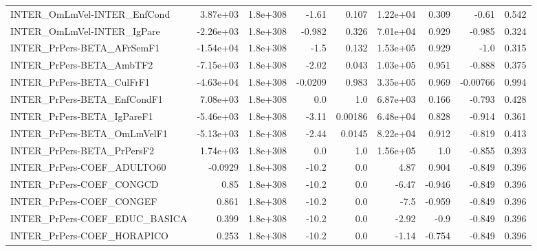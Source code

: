 \begin{tabular}{lrrrrrrrr}
INTER\_OmLmVel-INTER\_EnfCond           &    3.87e+03 &     1.8e+308 &   -1.61 &    0.107 &   1.22e+04 &       0.309 &        -0.61 &         0.542 \\
INTER\_OmLmVel-INTER\_IgPare            &   -2.26e+03 &     1.8e+308 &  -0.982 &    0.326 &   7.01e+04 &       0.929 &       -0.985 &         0.324 \\
INTER\_PrPers-BETA\_AFrSemF1            &   -1.54e+04 &     1.8e+308 &    -1.5 &    0.132 &   1.53e+05 &       0.929 &         -1.0 &         0.315 \\
INTER\_PrPers-BETA\_AmbTF2              &   -7.15e+03 &     1.8e+308 &   -2.02 &    0.043 &   1.03e+05 &       0.951 &       -0.888 &         0.375 \\
INTER\_PrPers-BETA\_CulFrF1             &   -4.63e+04 &     1.8e+308 & -0.0209 &    0.983 &   3.35e+05 &       0.969 &     -0.00766 &         0.994 \\
INTER\_PrPers-BETA\_EnfCondF1           &    7.08e+03 &     1.8e+308 &     0.0 &      1.0 &   6.87e+03 &       0.166 &       -0.793 &         0.428 \\
INTER\_PrPers-BETA\_IgPareF1            &   -5.46e+03 &     1.8e+308 &   -3.11 &  0.00186 &   6.48e+04 &       0.828 &       -0.914 &         0.361 \\
INTER\_PrPers-BETA\_OmLmVelF1           &   -5.13e+03 &     1.8e+308 &   -2.44 &   0.0145 &   8.22e+04 &       0.912 &       -0.819 &         0.413 \\
INTER\_PrPers-BETA\_PrPersF2            &    1.74e+03 &     1.8e+308 &     0.0 &      1.0 &   1.56e+05 &         1.0 &       -0.855 &         0.393 \\
INTER\_PrPers-COEF\_ADULTO60            &     -0.0929 &     1.8e+308 &   -10.2 &      0.0 &       4.87 &       0.904 &       -0.849 &         0.396 \\
INTER\_PrPers-COEF\_CONGCD              &        0.85 &     1.8e+308 &   -10.2 &      0.0 &      -6.47 &      -0.946 &       -0.849 &         0.396 \\
INTER\_PrPers-COEF\_CONGEF              &       0.861 &     1.8e+308 &   -10.2 &      0.0 &       -7.5 &      -0.959 &       -0.849 &         0.396 \\
INTER\_PrPers-COEF\_EDUC\_BASICA         &       0.399 &     1.8e+308 &   -10.2 &      0.0 &      -2.92 &        -0.9 &       -0.849 &         0.396 \\
INTER\_PrPers-COEF\_HORAPICO            &       0.253 &     1.8e+308 &   -10.2 &      0.0 &      -1.14 &      -0.754 &       -0.849 &         0.396 \\

\end{tabular}
